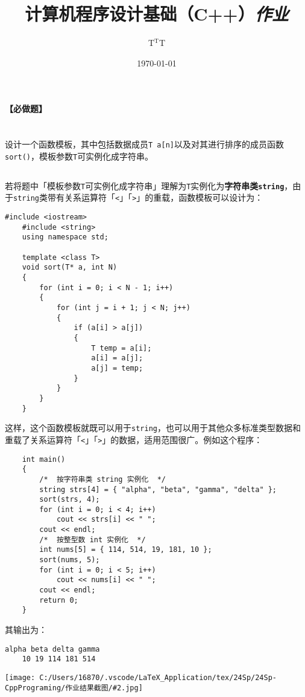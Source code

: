 \documentclass[10pt, a4paper, oneside, fontset=none]{ctexart}
\title
{
	\textbf{计算机程序设计基础（C++）}\textit{作业}
}
\author{\zihao{5} T$^\text{T}$T}
\date{\zihao{5}\kai \today}
\theoremstyle{plain}
\theoremstyle{definition}
\newcommand{\prtsc}[2][14]{\begin{center}
	\texttt{[image: C:/Users/16870/.vscode/LaTeX\_Application/tex/24Sp/24Sp-CppPrograming/作业结果截图/\#2.jpg]}
	\vspace{-1em}
\end{center}}
\begin{document}
\lineskip=0pt
\lineskiplimit=0pt
\renewcommand{\thesection}{第\arabic{section}题}
\renewcommand{\thesubsection}{解答}

\noindent\textbf{\Large\wen 【必做题】}

\section{}
设计一个函数模板，其中包括数据成员\texttt{T a[n]}以及对其进行排序的成员函数\texttt{sort()}，模板参数\texttt{T}可实例化成字符串。

\subsection{}
\kai

若将题中「模板参数\texttt{T}可实例化成字符串」理解为\texttt{T}实例化为\textbf{字符串类\texttt{string}}，由于\texttt{string}类带有关系运算符「\texttt{<}」「\texttt{>}」的重载，函数模板可以设计为：
\begin{lstlisting}[style=answer]
	#include <iostream>
	#include <string>
	using namespace std;
	
	template <class T>
	void sort(T* a, int N)
	{
		for (int i = 0; i < N - 1; i++)
		{
			for (int j = i + 1; j < N; j++)
			{
				if (a[i] > a[j])
				{
					T temp = a[i];
					a[i] = a[j];
					a[j] = temp;
				}
			}
		}
	}
\end{lstlisting}
这样，这个函数模板就既可以用于\texttt{string}，也可以用于其他众多标准类型数据和重载了关系运算符「\texttt{<}」「\texttt{>}」的数据，适用范围很广。例如这个程序：
\begin{lstlisting}
	int main()
	{
		/*  按字符串类 string 实例化  */
		string strs[4] = { "alpha", "beta", "gamma", "delta" };
		sort(strs, 4);
		for (int i = 0; i < 4; i++)
			cout << strs[i] << " ";
		cout << endl;
		/*  按整型数 int 实例化  */
		int nums[5] = { 114, 514, 19, 181, 10 };
		sort(nums, 5);
		for (int i = 0; i < 5; i++)
			cout << nums[i] << " ";
		cout << endl;
		return 0;
	}
\end{lstlisting}
其输出为：
\begin{lstlisting}[style=output]
	alpha beta delta gamma
	10 19 114 181 514
\end{lstlisting}
\prtsc{12-01-1}
\end{document}
